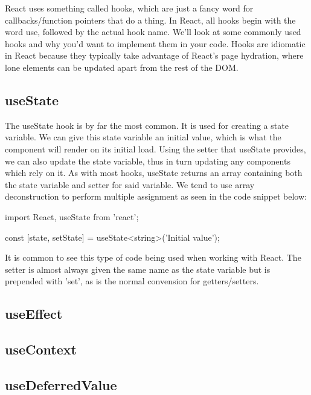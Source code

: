 \documentclass{article}
\begin{document}
React uses something called hooks, which are just a fancy word for callbacks/function pointers that do a thing.
In React, all hooks begin with the word use, followed by the actual hook name. We'll look at some commonly
used hooks and why you'd want to implement them in your code. Hooks are idiomatic in React because they
typically take advantage of React's page hydration, where lone elements can be updated apart from the rest of
the DOM.

\subsection{useState}

The useState hook is by far the most common. It is used for creating a state variable. We can give this state
variable an initial value, which is what the component will render on its initial load. Using the setter that
useState provides, we can also update the state variable, thus in turn updating any components which rely on
it. As with most hooks, useState returns an array containing both the state variable and setter for said
variable. We tend to use array deconstruction to perform multiple assignment as seen in the code snippet below:

\begin{tslst}

import React, { useState } from 'react';

const [state, setState] = useState<string>('Initial value');

\end{tslst}

It is common to see this type of code being used when working with React. The setter is almost always given the
same name as the state variable but is prepended with 'set', as is the normal convension for getters/setters.

\subsection{useEffect}

\subsection{useContext}

\subsection{useDeferredValue}
\end{document}
